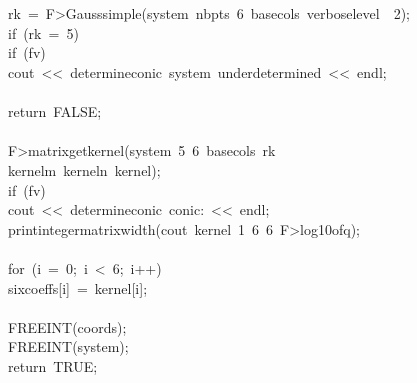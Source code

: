 \begin{tabbing}
\\[0pt]
\\[0pt]
\>rk\ =\ F>Gausssimple(system\ nbpts\ 6\ basecols\ verboselevel\ \ 2);\\[0pt]
\>if\ (rk\ =\ 5)\ \\[0pt]
\>\>if\ (fv)\ \\[0pt]
\>\>\>cout\ <<\ determineconic\ system\ underdetermined\ <<\ endl;\\[0pt]
\>\>\>\\[0pt]
\>\>return\ FALSE;\\[0pt]
\>\>\\[0pt]
\>F>matrixgetkernel(system\ 5\ 6\ basecols\ rk\ \\[0pt]
\>\>kernelm\ kerneln\ kernel);\\[0pt]
\>if\ (fv)\ \\[0pt]
\>\>cout\ <<\ determineconic\ conic:\ <<\ endl;\\[0pt]
\>\>printintegermatrixwidth(cout\ kernel\ 1\ 6\ 6\ F>log10ofq);\\[0pt]
\>\>\\[0pt]
\>for\ (i\ =\ 0;\ i\ <\ 6;\ i++)\ \\[0pt]
\>\>sixcoeffs[i]\ =\ kernel[i];\\[0pt]
\>\>\\[0pt]
\>FREEINT(coords);\\[0pt]
\>FREEINT(system);\\[0pt]
\>return\ TRUE;\\[0pt]
\\[0pt]
\\[0pt]
\\[0pt]
\end{tabbing}
